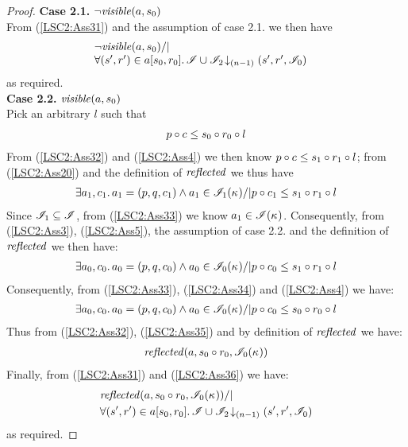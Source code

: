 \begin{lemma}
\begin{proof}
\noindent \textbf{Case 2.1. } $ \neg\mathit{visible}(a, s_0)$\\
From (\ref{LSC2:Ass31}) and the assumption of case 2.1. we then have
\begin{align*}
	&\begin{array}{@{} l @{}}
		\neg\m{visible}(a, s_0) /| \\
		\for{(s', r') \in a[s_0, r_0]} \extendsAMUpto{\lmod \cup \lmod_2}{(n-1)}{s'}{r'}{\lmod_0}
	\end{array}
\end{align*}
%
as required.\\

\noindent\textbf{Case 2.2. } $\mathit{visible}(a, s_0)$\\
Pick an arbitrary $l$ such that 
%
\begin{align}
	p \circ c \leq s_0 \circ r_0 \circ l
	\label{LSC2:Ass32}
\end{align}
From (\ref{LSC2:Ass32}) and (\ref{LSC2:Ass4}) we then know $p \circ c \leq s_1 \circ r_1 \circ l$; from (\ref{LSC2:Ass20}) and the definition of $\mathit{reflected}$ we thus have
%
\begin{align}
	\exists a_1, c_1.\, a_1 = (p, q, c_1) \land a_1 \in \mathscr{I}_1(\kappa_{})  /| p \circ c_1 \leq s_1 \circ r_1 \circ l
	\label{LSC2:Ass33}
\end{align}
%
Since $\mathscr{I}_1 \subseteq \mathscr{I}$, from (\ref{LSC2:Ass33}) we know $a_1 \in \mathscr{I}(\kappa_{})$. Consequently, from (\ref{LSC2:Ass3}), (\ref{LSC2:Ass5}), the assumption of case 2.2. and the definition of $\mathit{reflected}$ we then have:
\begin{align}
	\exists a_0, c_0.\, a_0 = (p, q, c_0) \land a_0 \in \mathscr{I}_0(\kappa_{})  /| p \circ c_0 \leq s_1 \circ r_1 \circ l
	\label{LSC2:Ass34}
\end{align}
%
Consequently, from (\ref{LSC2:Ass33}), (\ref{LSC2:Ass34}) and (\ref{LSC2:Ass4}) we have:
\begin{align}
	\exists a_0, c_0.\, a_0 = (p, q, c_0) \land a_0 \in \mathscr{I}_0(\kappa_{}) /| p \circ c_0 \leq s_0 \circ r_0 \circ l
	\label{LSC2:Ass35}
\end{align}
%
Thus from (\ref{LSC2:Ass32}), (\ref{LSC2:Ass35}) and by definition of $\mathit{reflected}$ we have:
%
\begin{align}
	\mathit{reflected}(a, s_0 \circ r_0, \mathscr{I}_0(\kappa_{})) 
	\label{LSC2:Ass36}
\end{align}
%
Finally, from (\ref{LSC2:Ass31}) and (\ref{LSC2:Ass36}) we have:
%
\begin{align*}
	& \mathit{reflected}(a, s_0 \circ r_0, \mathscr{I}_0(\kappa_{}))  /| \\
	& \forall (s', r') \in a[s_0, r_0].\, \mathscr{I} \cup \mathscr{I}_2 \!\downarrow_{(n-1)} \left(s', r', \mathscr{I}_0\right)
\end{align*}
%
as required.

\end{proof}
%
\end{lemma}

